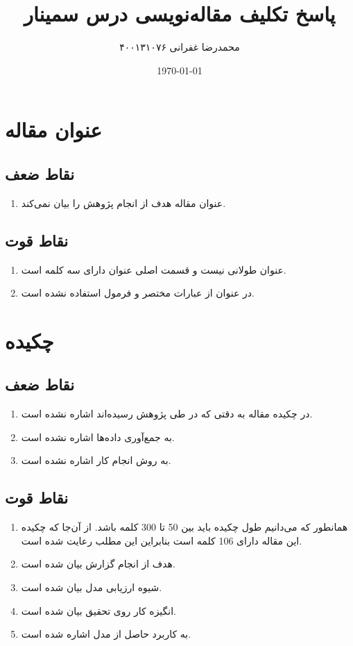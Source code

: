 \documentclass[14pt,a4]{article}
\title{\vspace{-4cm} \textbf{پاسخ تکلیف مقاله‌نویسی درس سمینار}}
\author{محمدرضا غفرانی  ۴۰۰۱۳۱۰۷۶}
\date{\today}
\begin{document}
\maketitle

\section{عنوان مقاله}

\subsection{نقاط ضعف}

\begin{enumerate}
    \item عنوان مقاله هدف از انجام پژوهش را بیان نمی‌کند.
\end{enumerate}

\subsection{نقاط قوت}

\begin{enumerate}
    \item عنوان طولانی نیست و قسمت اصلی عنوان دارای سه کلمه است.
    \item در عنوان از عبارات مختصر و فرمول استفاده نشده است.
\end{enumerate}

\section{چکیده}

\subsection{نقاط ضعف}

\begin{enumerate}
    \item در چکیده مقاله به دقتی که در طی پژوهش رسیده‌اند اشاره نشده است.
    \item به جمع‌آوری داده‌ها اشاره نشده است.
    \item به روش انجام کار اشاره نشده است.
\end{enumerate}

\subsection{نقاط قوت}

\begin{enumerate}
    \item همانطور که می‌دانیم طول چکیده باید بین 50 تا 300 کلمه باشد. از آن‌جا که چکیده این مقاله دارای 106 کلمه است
    بنابراین این مطلب رعایت شده است.
    \item هدف از انجام گزارش بیان شده است.
    \item شیوه ارزیابی مدل بیان شده است.
    \item انگیزه کار روی تحقیق بیان شده است.
    \item به کاربرد حاصل از مدل اشاره شده است.
\end{enumerate}
\end{document}
